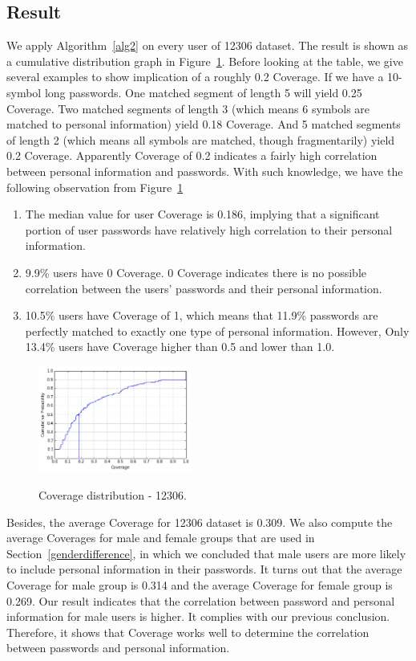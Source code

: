 \subsection{Result}
We apply Algorithm~\ref{alg2} on every user of 12306 dataset. The result is shown as a cumulative distribution graph in Figure~\ref{f2}. Before looking at the table, we give several examples to show implication of a roughly 0.2 Coverage. If we have a 10-symbol long passwords. One matched segment of length 5 will yield 0.25 Coverage. Two matched segments of length 3 (which means 6 symbols are matched to personal information) yield 0.18 Coverage. And 5 matched segments of length 2 (which means all symbols are matched, though fragmentarily) yield 0.2 Coverage. Apparently Coverage of 0.2 indicates a fairly high correlation between personal information and passwords. With such knowledge, we have the following observation from Figure~\ref{f2}
\begin{enumerate}[leftmargin=*]
\item The median value for user Coverage is 0.186, implying that a significant portion of user passwords have relatively high correlation to their personal information.
\item 9.9\% users have 0 Coverage. 0 Coverage indicates there is no possible correlation between the users' passwords and their personal information.
\item 10.5\% users have Coverage of 1, which means that 11.9\% passwords are perfectly matched to exactly one type of personal information. However, Only 13.4\% users have Coverage higher than 0.5 and lower than 1.0. 
\end{enumerate}

\begin{figure}[h!]
\centering
  \caption{Coverage distribution - 12306.}{}
  \label{f2}
  \centering
    \includegraphics[width=0.45\textwidth]{fig/cvghist}
\end{figure}

Besides, the average Coverage for 12306 dataset is 0.309. We also compute the average Coverages for male and female groups that are used in Section~\ref{genderdifference}, in which we concluded that male users are more likely to include personal information in their passwords. It turns out that the average Coverage for male group is 0.314 and the average Coverage for female group is 0.269. Our result indicates that the correlation between password and personal information for male users is higher. It complies with our previous conclusion. Therefore, it shows that Coverage works well to determine the correlation between passwords and personal information.

